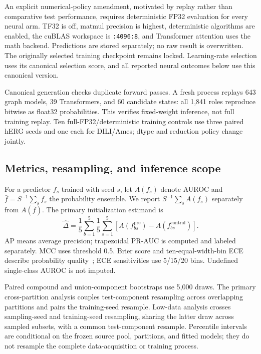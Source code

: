 \documentclass[runningheads,a4paper]{llncs}
\begin{document}
An explicit numerical-policy amendment, motivated by replay rather than comparative test performance, requires deterministic FP32 evaluation for every neural arm. TF32 is off, matmul precision is highest, deterministic algorithms are enabled, the cuBLAS workspace is \texttt{:4096:8}, and Transformer attention uses the math backend. Predictions are stored separately; no raw result is overwritten. The originally selected training checkpoint remains locked. Learning-rate selection uses its canonical selection score, and all reported neural outcomes below use this canonical version.

Canonical generation checks duplicate forward passes. A fresh process replays 643 graph models, 39 Transformers, and 60 candidate states: all 1,841 roles reproduce bitwise as float32 probabilities. This verifies fixed-weight inference, not full training replay. Ten full-FP32/deterministic training controls use three paired hERG seeds and one each for DILI/Ames; dtype and reduction policy change jointly.

\subsection{Metrics, resampling, and inference scope}
For a predictor $f_s$ trained with seed $s$, let $A(f_s)$ denote AUROC and $\bar f=S^{-1}\sum_s f_s$ the probability ensemble. We report $S^{-1}\sum_s A(f_s)$ separately from $A(\bar f)$. The primary initialization estimand is
\begin{equation}
 \widehat\Delta=\frac{1}{5}\sum_{b=1}^{5}\frac{1}{5}\sum_{s=1}^{5}
 \left[A(f^{\mathrm{pre}}_{bs})-A(f^{\mathrm{control}}_{bs})\right].
\end{equation}
AP means average precision; trapezoidal PR-AUC is computed and labeled separately. MCC uses threshold 0.5. Brier score and ten-equal-width-bin ECE describe probability quality~\cite{brier1950verification,guo2017calibration}; ECE sensitivities use 5/15/20 bins. Undefined single-class AUROC is not imputed.

Paired compound and union-component bootstraps use 5,000 draws. The primary cross-partition analysis couples test-component resampling across overlapping partitions and pairs the training-seed resample. Low-data analysis crosses sampling-seed and training-seed resampling, sharing the latter draw across sampled subsets, with a common test-component resample. Percentile intervals are conditional on the frozen source pool, partitions, and fitted models; they do not resample the complete data-acquisition or training process.
\end{document}
